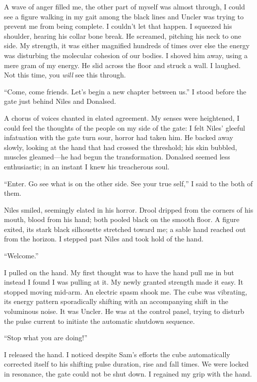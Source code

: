 A wave of anger filled me, the other part of myself was almost through,
I could see a figure walking in my gait among the black lines and Uncler
was trying to prevent me from being complete. I couldn't let that
happen. I squeezed his shoulder, hearing his collar bone break. He
screamed, pitching his neck to one side. My strength, it was either
magnified hundreds of times over else the energy was disturbing the
molecular cohesion of our bodies. I shoved him away, using a mere gram
of my energy. He slid across the floor and struck a wall. I laughed. Not
this time, you \emph{will} see this through.

``Come, come friends. Let's begin a new chapter between us.'' I stood
before the gate just behind Niles and Donalsed.

A chorus of voices chanted in elated agreement. My senses were
heightened, I could feel the thoughts of the people on my side of the
gate: I felt Niles' gleeful infatuation with the gate turn sour, horror
had taken him. He backed away slowly, looking at the hand that had
crossed the threshold; his skin bubbled, muscles gleamed---he had begun
the transformation. Donalsed seemed less enthusiastic; in an instant I
knew his treacherous soul.

``Enter. Go see what is on the other side. See your true self,'' I said
to the both of them.

Niles smiled, seemingly elated in his horror. Drool dripped from the
corners of his mouth, blood from his hand; both pooled black on the
smooth floor. A figure exited, its stark black silhouette stretched
toward me; a sable hand reached out from the horizon. I stepped past
Niles and took hold of the hand.

``Welcome.''

I pulled on the hand. My first thought was to have the hand pull me in
but instead I found I was pulling at it. My newly granted strength made
it easy. It stopped moving mid-arm. An electric spasm shook me. The cube
was vibrating, its energy pattern sporadically shifting with an
accompanying shift in the voluminous noise. It was Uncler. He was at the
control panel, trying to disturb the pulse current to initiate the
automatic shutdown sequence.

``Stop what you are doing!''

I released the hand. I noticed despite Sam's efforts the cube
automatically corrected itself to his shifting pulse duration, rise and
fall times. We were locked in resonance, the gate could not be shut
down. I regained my grip with the hand.

